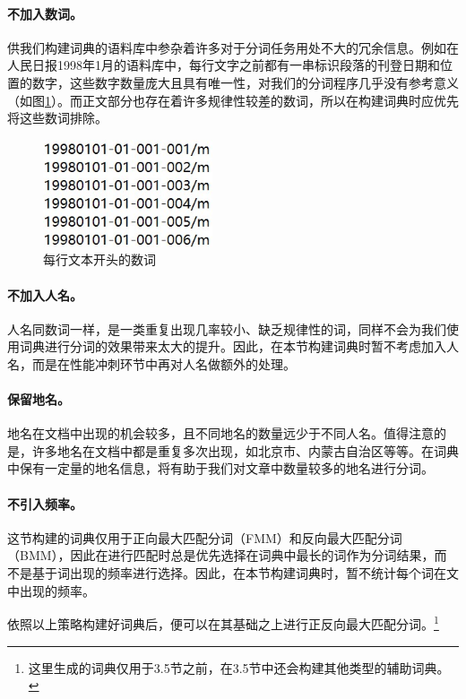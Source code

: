 \documentclass[11pt,a4paper]{article}
\begin{document}
	\paragraph{不加入数词。}供我们构建词典的语料库中参杂着许多对于分词任务用处不大的冗余信息。例如在人民日报1998年1月的语料库中，每行文字之前都有一串标识段落的刊登日期和位置的数字，这些数字数量庞大且具有唯一性，对我们的分词程序几乎没有参考意义（如图\ref{num_word}）。而正文部分也存在着许多规律性较差的数词，所以在构建词典时应优先将这些数词排除。
	
	\begin{figure}[htbp]
		\centering
		\includegraphics[width=5cm]{num_word.jpg}
		\caption{每行文本开头的数词}\label{num_word}
	\end{figure}
	
	\paragraph{不加入人名。}人名同数词一样，是一类重复出现几率较小、缺乏规律性的词，同样不会为我们使用词典进行分词的效果带来太大的提升。因此，在本节构建词典时暂不考虑加入人名，而是在性能冲刺环节中再对人名做额外的处理。
	
	\paragraph{保留地名。}地名在文档中出现的机会较多，且不同地名的数量远少于不同人名。值得注意的是，许多地名在文档中都是重复多次出现，如北京市、内蒙古自治区等等。在词典中保有一定量的地名信息，将有助于我们对文章中数量较多的地名进行分词。
	
	\paragraph{不引入频率。}这节构建的词典仅用于正向最大匹配分词（FMM）和反向最大匹配分词（BMM），因此在进行匹配时总是优先选择在词典中最长的词作为分词结果，而不是基于词出现的频率进行选择。因此，在本节构建词典时，暂不统计每个词在文中出现的频率。
	
	依照以上策略构建好词典后，便可以在其基础之上进行正反向最大匹配分词。\footnote{这里生成的词典仅用于3.5节之前，在3.5节中还会构建其他类型的辅助词典。}
	
\end{document}
